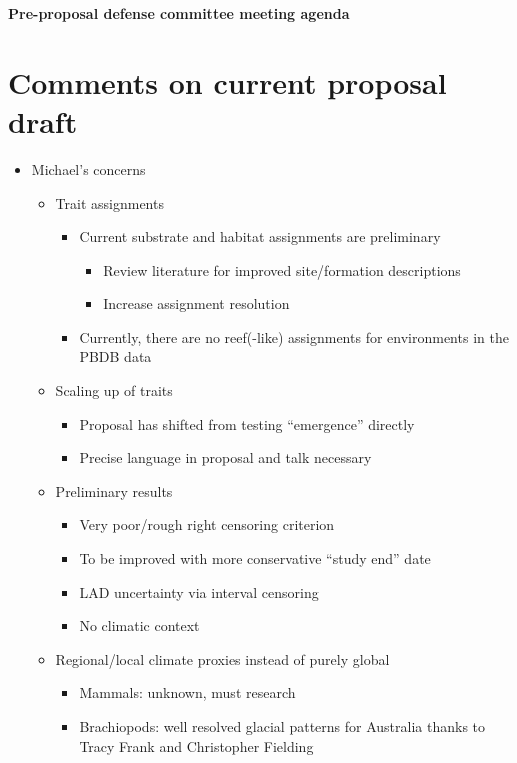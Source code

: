 \documentclass[12pt,letterpaper]{article}
\begin{document}
\setcounter{secnumdepth}{0}

\begin{Large}
  \textbf{Pre-proposal defense committee meeting agenda}
\end{Large}

\section{Comments on current proposal draft}
\begin{itemize}
  \item Michael's concerns
    \begin{itemize}
      \item Trait assignments
        \begin{itemize}
          \item Current substrate and habitat assignments are preliminary
            \begin{itemize}
              \item Review literature for improved site/formation descriptions
              \item Increase assignment resolution
            \end{itemize}
          \item Currently, there are no reef(-like) assignments for environments in the PBDB data
        \end{itemize}
      \item Scaling up of traits
        \begin{itemize}
          \item Proposal has shifted from testing ``emergence'' directly
          \item Precise language in proposal and talk necessary
        \end{itemize}
      \item Preliminary results
        \begin{itemize}
          \item Very poor/rough right censoring criterion
          \item To be improved with more conservative ``study end'' date
          \item LAD uncertainty via interval censoring
          \item No climatic context
        \end{itemize}
      \item Regional/local climate proxies instead of purely global
        \begin{itemize}
          \item Mammals: unknown, must research
          \item Brachiopods: well resolved glacial patterns for Australia thanks to Tracy Frank and Christopher Fielding
        \end{itemize}
    \end{itemize}
\end{itemize}
\end{document}
